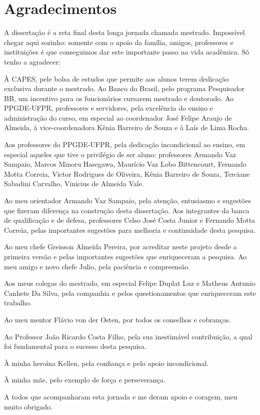 \documentclass[../thesis.tex]{subfiles}
\begin{document}
	
	\newpage
	
	\section*{Agradecimentos} %
	
	\begin{spacing}{1.1}
		
	A dissertação é a reta final desta longa jornada chamada mestrado. Impossível chegar aqui sozinho: somente com o apoio da família, amigos, professores e instituições é que conseguimos dar este importante passo na vida acadêmica. Só tenho a agradecer:
	
	À CAPES, pele bolsa de estudos que permite aos alunos terem dedicação exclusiva durante o mestrado. Ao Banco do Brasil, pelo programa Pesquisador BB, um incentivo para os funcionários cursarem mestrado e doutorado. Ao PPGDE-UFPR, professores e servidores, pela excelência do ensino e administração do curso, em especial ao coordenador José Felipe Araujo de Almeida, à vice-coordenadora Kênia Barreiro de Souza e à Laís de Lima Rocha.

	Aos professores do PPGDE-UFPR, pela dedicação incondicional ao ensino, em especial aqueles que tive o privilégio de ser aluno: professores Armando Vaz Sampaio, Marcos Minoru Hasegawa, Maurício Vaz Lobo Bittencourt, Fernando Motta Correia, Victor Rodrigues de Oliveira, Kênia Barreiro de Souza, Terciane Sabadini Carvalho, Vinicius de Almeida Vale. %
	
	Ao meu orientador Armando Vaz Sampaio, pela atenção, entusiasmo e sugestões que fizeram diferença na construção desta dissertação. Aos integrantes da banca de qualificação e de defesa, professores Celso José Costa Junior e Fernando Motta Correia, pelas importantes sugestões para melhoria e continuidade desta pesquisa.

	Ao meu chefe Greisson Almeida Pereira, por acreditar neste projeto desde a primeira versão e pelas importantes sugestões que enriqueceram a pesquisa. Ao meu amigo e novo chefe Julio, pela paciência e compreensão.
	
	Aos meus colegas do mestrado, em especial Felipe Duplat Luz e Matheus Antunio Canhete Da Silva, pela companhia e pelos questionamentos que enriqueceram este trabalho.
	
	Ao meu mentor Flávio von der Osten, por todos os conselhos e cobranças.
	
	Ao Professor João Ricardo Costa Filho, pela sua inestimável contribuição, a qual foi fundamental para o sucesso desta pesquisa.
	
	À minha heroína Kellen, pela confiança e pelo apoio incondicional.
	
	À minha mãe, pelo exemplo de força e perseverança.
	
	A todos que acompanharam esta jornada e me deram apoio e coragem, meu muito obrigado.
	
	\end{spacing}
	
	\thispagestyle{empty}
\end{document}
